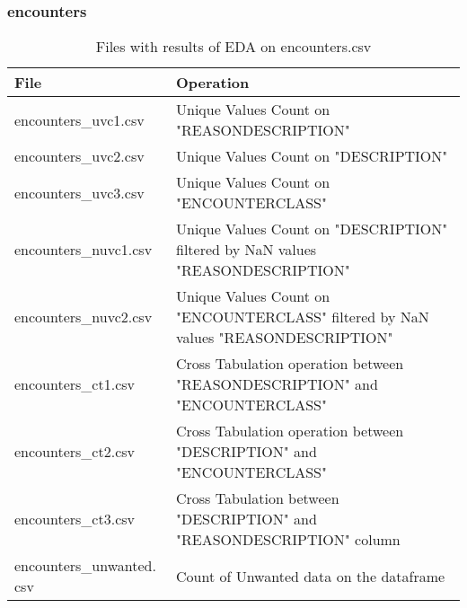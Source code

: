 \documentclass[12pt, twosided]{report}  %
\begin{document}
\subsubsection{encounters}

\begin{table}[H]
	\centering
	\begin{tabular}{p{5cm}|p{14.5cm}}
		\textbf{File}             & \textbf{Operation} \\ \hline
		encounters\_uvc1.csv      & Unique Values Count on "REASONDESCRIPTION"   \\
		encounters\_uvc2.csv      & Unique Values Count on "DESCRIPTION"   \\
		encounters\_uvc3.csv      & Unique Values Count on "ENCOUNTERCLASS"   \\
		encounters\_nuvc1.csv     & Unique Values Count on "DESCRIPTION" filtered by NaN values "REASONDESCRIPTION" \\
		encounters\_nuvc2.csv     & Unique Values Count on "ENCOUNTERCLASS" filtered by NaN values "REASONDESCRIPTION" \\
		encounters\_ct1.csv       & Cross Tabulation operation between "REASONDESCRIPTION" and "ENCOUNTERCLASS" \\
		encounters\_ct2.csv       & Cross Tabulation operation between "DESCRIPTION" and "ENCOUNTERCLASS" \\
		encounters\_ct3.csv       & Cross Tabulation between "DESCRIPTION" and "REASONDESCRIPTION" column \\
		encounters\_unwanted. csv & Count of Unwanted data on the dataframe  
	\end{tabular}
	\caption{Files with results of EDA on encounters.csv}
\end{table}
\end{document}
